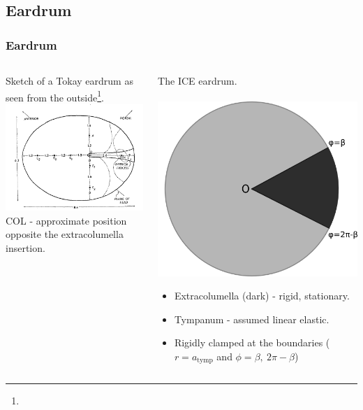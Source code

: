 \documentclass{beamer}
\let\oldfootnotesize\footnotesize
\renewcommand*{\footnotesize}{\oldfootnotesize\tiny}
\begin{document}
\subsection{Eardrum}
\begin{frame}[t]
\frametitle{Eardrum}
\begin{columns}
    \begin{column}{0.5\textwidth}
      \centering
      \small
      Sketch of a Tokay eardrum as seen from the outside\footnote{}.\\
      \includegraphics[width = 3.7 cm]{Diagrams/geckoear.png}\\
      \footnotesize
     COL - approximate position opposite the extracolumella insertion.
    \end{column}

    \begin{column}{0.5\textwidth}
      \centering
      \small
      The ICE eardrum.\\
      \textbf{}\\
      \includegraphics[width = 3.2 cm]{Diagrams/tympanummodel.png}\\
\footnotesize
\begin{itemize}
      \item[] Extracolumella (dark) - rigid, stationary.
      \item[] Tympanum - assumed linear elastic.
      \item[] Rigidly clamped at the boundaries ($r=a_{\mathrm{tymp}}$ and $\phi=\beta,\ 2\pi-\beta$)
\end{itemize}

    \end{column}
  \end{columns}
  
\end{frame}
\end{document}
